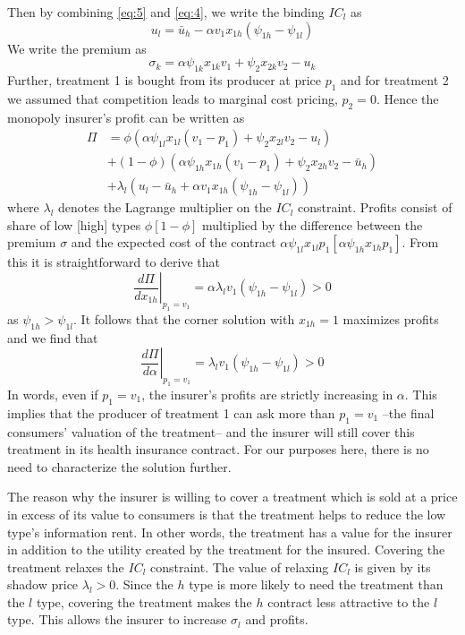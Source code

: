 \documentclass[a4paper,12pt]{article}
\begin{document}
Then by combining \eqref{eq:5} and \eqref{eq:4}, we write the binding \(IC_l\) as
\begin{equation}
\label{eq:6}
u_l = \bar u_h - \alpha v_1 x_{1h} (\psi_{1h}-\psi_{1l})
\end{equation}
We write the premium as
\begin{equation}
\label{eq:7}
\sigma_k = \alpha \psi_{1k} x_{1k} v_1 + \psi_2 x_{2k} v_2 - u_k
\end{equation}
Further, treatment 1 is bought from its producer at price \(p_1\) and for treatment 2 we assumed that competition leads to marginal cost pricing, \(p_2=0\). Hence the monopoly insurer's profit can be written as
\begin{align}
\label{eq:8}
\Pi &= \phi (\alpha \psi_{1l}x_{1l}(v_1-p_1)+\psi_2 x_{2l}v_2 - u_l) \\
\nonumber
    &+ (1-\phi) (\alpha \psi_{1h} x_{1h}(v_1-p_1) + \psi_2 x_{2h} v_2 - \bar u_h) \\
\nonumber
 &+ \lambda_l(u_l - \bar u_h + \alpha v_1 x_{1h}(\psi_{1h}-\psi_{1l}))
\end{align}
where \(\lambda_l\) denotes the Lagrange multiplier on the \(IC_l\) constraint. Profits consist of share of low [high] types \(\phi [1-\phi]\) multiplied by the difference between the premium \(\sigma\) and the expected cost of the contract \(\alpha \psi_{1l} x_{1l} p_1 [\alpha \psi_{1h} x_{1h} p_1 ]\). From this it is straightforward to derive that
\begin{equation}
\label{eq:9}
\left. \frac{d\Pi}{dx_{1h}} \right|_{p_1=v_1} = \alpha \lambda_l v_1 (\psi_{1h}-\psi_{1l}) > 0
\end{equation}
as \(\psi_{1h}>\psi_{1l}\). It follows that the corner solution with \(x_{1h} =1\) maximizes profits and we find that
\begin{equation}
\label{eq:10}
\left. \frac{d\Pi}{d \alpha} \right|_{p_1=v_1} = \lambda_l v_1 (\psi_{1h}-\psi_{1l}) > 0
\end{equation}
In words, even if \(p_1=v_1\), the insurer's profits are strictly increasing in \(\alpha\). This implies that the producer of treatment 1 can ask more than \(p_1 = v_1\) --the final consumers' valuation of the treatment-- and the insurer will still cover this treatment in its health insurance contract. For our purposes here, there is no need to characterize the solution further.

The reason why the insurer is willing to cover a treatment which is sold at a price in excess of its value to consumers is that the treatment helps to reduce the low type's information rent. In other words, the treatment has a value for the insurer in addition to the utility created by the treatment for the insured. Covering the treatment relaxes the \(IC_l\) constraint. The value of relaxing \(IC_l\) is given by its shadow price \(\lambda_l > 0\). Since the \(h\) type is more likely to need the treatment than the \(l\) type, covering the treatment makes the \(h\) contract less attractive to the \(l\) type. This allows the insurer to increase \(\sigma_l\) and profits.
\end{document}
